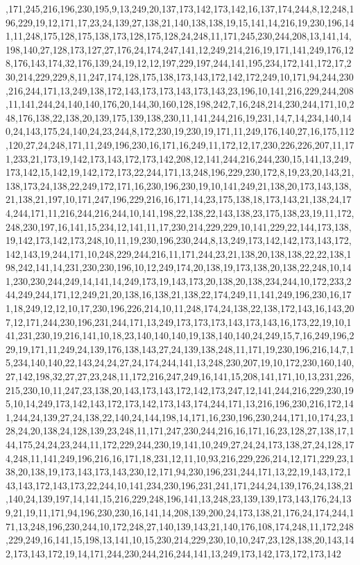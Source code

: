 ,171,245,216,196,230,195,9,13,249,20,137,173,142,173,142,16,137,174,244,8,12,248,196,229,19,12,171,17,23,24,139,27,138,21,140,138,138,19,15,141,14,216,19,230,196,141,11,248,175,128,175,138,173,128,175,128,24,248,11,171,245,230,244,208,13,141,14,198,140,27,128,173,127,27,176,24,174,247,141,12,249,214,216,19,171,141,249,176,128,176,143,174,32,176,139,24,19,12,12,197,229,197,244,141,195,234,172,141,172,17,230,214,229,229,8,11,247,174,128,175,138,173,143,172,142,172,249,10,171,94,244,230,216,244,171,13,249,138,172,143,173,173,143,173,143,23,196,10,141,216,229,244,208,11,141,244,24,140,140,176,20,144,30,160,128,198,242,7,16,248,214,230,244,171,10,248,176,138,22,138,20,139,175,139,138,230,11,141,244,216,19,231,14,7,14,234,140,140,24,143,175,24,140,24,23,244,8,172,230,19,230,19,171,11,249,176,140,27,16,175,112,120,27,24,248,171,11,249,196,230,16,171,16,249,11,172,12,17,230,226,226,207,11,171,233,21,173,19,142,173,143,172,173,142,208,12,141,244,216,244,230,15,141,13,249,173,142,15,142,19,142,172,173,22,244,171,13,248,196,229,230,172,8,19,23,20,143,21,138,173,24,138,22,249,172,171,16,230,196,230,19,10,141,249,21,138,20,173,143,138,21,138,21,197,10,171,247,196,229,216,16,171,14,23,175,138,18,173,143,21,138,24,174,244,171,11,216,244,216,244,10,141,198,22,138,22,143,138,23,175,138,23,19,11,172,248,230,197,16,141,15,234,12,141,11,17,230,214,229,229,10,141,229,22,144,173,138,19,142,173,142,173,248,10,11,19,230,196,230,244,8,13,249,173,142,142,173,143,172,142,143,19,244,171,10,248,229,244,216,11,171,244,23,21,138,20,138,138,22,22,138,198,242,141,14,231,230,230,196,10,12,249,174,20,138,19,173,138,20,138,22,248,10,141,230,230,244,249,14,141,14,249,173,19,143,173,20,138,20,138,234,244,10,172,233,244,249,244,171,12,249,21,20,138,16,138,21,138,22,174,249,11,141,249,196,230,16,171,18,249,12,12,10,17,230,196,226,214,10,11,248,174,24,138,22,138,172,143,16,143,207,12,171,244,230,196,231,244,171,13,249,173,173,173,143,173,143,16,173,22,19,10,141,231,230,19,216,141,10,18,23,140,140,140,19,138,140,140,24,249,15,7,16,249,196,229,19,171,11,249,24,139,176,138,143,27,24,139,138,248,11,171,19,230,196,216,14,7,15,234,140,140,22,143,24,24,27,24,174,244,141,13,248,230,207,19,10,172,230,160,140,27,142,198,32,27,27,23,248,11,172,216,247,249,16,141,15,208,141,171,10,13,231,226,215,230,10,11,247,23,138,20,143,173,143,172,142,173,247,12,141,244,216,229,230,195,10,14,249,173,142,143,172,173,142,173,143,174,244,171,13,216,196,230,216,172,141,244,24,139,27,24,138,22,140,24,144,198,14,171,16,230,196,230,244,171,10,174,23,128,24,20,138,24,128,139,23,248,11,171,247,230,244,216,16,171,16,23,128,27,138,17,144,175,24,24,23,244,11,172,229,244,230,19,141,10,249,27,24,24,173,138,27,24,128,174,248,11,141,249,196,216,16,171,18,231,12,11,10,93,216,229,226,214,12,171,229,23,138,20,138,19,173,143,173,143,230,12,171,94,230,196,231,244,171,13,22,19,143,172,143,143,172,143,173,22,244,10,141,234,230,196,231,241,171,244,24,139,176,24,138,21,140,24,139,197,14,141,15,216,229,248,196,141,13,248,23,139,139,173,143,176,24,139,21,19,11,171,94,196,230,230,16,141,14,208,139,200,24,173,138,21,176,24,174,244,171,13,248,196,230,244,10,172,248,27,140,139,143,21,140,176,108,174,248,11,172,248,229,249,16,141,15,198,13,141,10,15,230,214,229,230,10,10,247,23,128,138,20,143,142,173,143,172,19,14,171,244,230,244,216,244,141,13,249,173,142,173,172,173,142